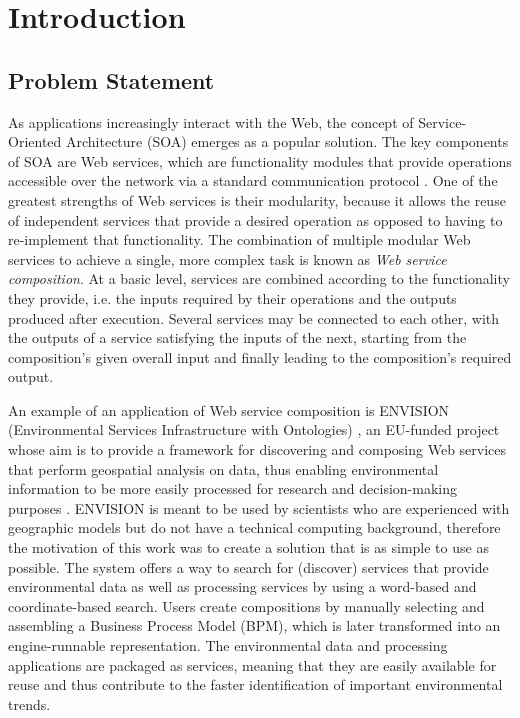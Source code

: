 \chapter{Introduction}\label{C:intro}

\section{Problem Statement}
As applications increasingly interact with the Web, the concept of Service-Oriented Architecture (SOA) \cite{perrey2003service}
emerges as a popular solution. The key components of SOA are Web services, which are functionality modules that
provide operations accessible over the network via a standard communication protocol \cite{gottschalk2002introduction}. One of the greatest strengths of Web services is their modularity, because it allows the reuse of independent services that provide a
desired operation as opposed to having to re-implement that functionality. The combination of multiple modular Web services
to achieve a single, more complex task is known as \textit{Web service composition}. At a basic level, services are combined according to the functionality they provide, i.e. the inputs required by their operations and the outputs produced after execution. Several services may be connected to each other, with the outputs of a service satisfying the inputs of the next, starting from the composition's given overall input and finally leading to the composition's required output.

An example of an application of Web service composition is ENVISION (Environmental Services Infrastructure with Ontologies) \cite{maue2011envision}, an EU-funded project whose aim is to provide a framework for discovering and composing Web services that perform geospatial analysis on data, thus enabling environmental information to be more easily processed for research and decision-making purposes \cite{maue2011envision}. ENVISION is
meant to be used by scientists who are experienced with geographic models but do not have a technical computing background, therefore the motivation of this work was to create a solution that is as simple to use as possible. The system offers
a way to search for (discover) services that provide environmental data as well as processing services by using a
word-based and coordinate-based search. Users create compositions by manually selecting and assembling a Business Process Model (BPM), which is later transformed into an engine-runnable representation. The environmental data and processing applications are packaged as services, meaning that they are easily available for reuse and thus contribute to the faster identification of important environmental trends.

